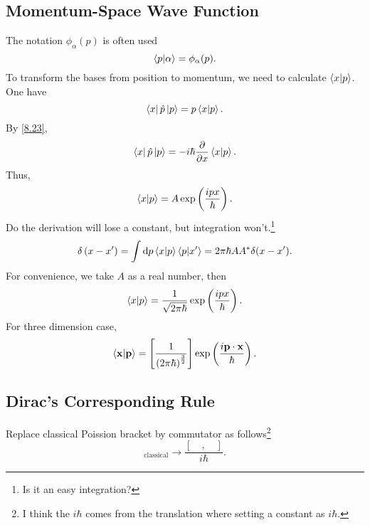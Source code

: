 \documentclass{article}
\theoremstyle{1}
\newcommand{\pa}{\partial}
\begin{document}
\subsection{Momentum-Space Wave Function}
The notation $\phi_\alpha(p)$ is often used 
\begin{equation}
    \braket{p}{\alpha}=\phi_{\alpha}(p).
\end{equation}
To transform the bases from position to momentum, we need to calculate $\braket{x}{p}$.
\newline
One have 
\begin{equation}
    \bra{x}\hat{p}\ket{p}=p\bra{x}\ket{p}.
\end{equation}
By \eqref{8.23},
\begin{equation}
   \bra{x}\hat{p}\ket{p}=-i\hbar\frac{\pa}{\pa x}\bra{x}\ket{p}.
\end{equation}
Thus, 
\begin{equation}
    \bra{x}\ket{p}=A\exp\left(\frac{ipx}{\hbar}\right).
\end{equation}
Do the derivation will lose a constant, but integration won't.\footnote{Is it an easy integration?}
\begin{equation}
    \delta\left(x-x'\right)=\int \dd{p}\bra{x}\ket{p}\bra{p}\ket{x'}=2\pi \hbar AA^*\delta(x-x').
\end{equation}
For convenience, we take $A$ as a real number, then 
\begin{equation}
    \bra{x}\ket{p}=\frac{1}{\sqrt{2\pi \hbar}}\exp\left(\frac{ipx}{\hbar}\right).
\end{equation}
For three dimension case, 
\begin{equation}
    \bra{\mathbf{x}}\ket{\mathbf{p}}=\left[\frac{1}{\left(2\pi\hbar\right)^{\frac{3}{2}}}\right]\exp\left(\frac{i\mathbf{p}\cdot\mathbf{x}}{\hbar}\right).
\end{equation}
\subsection{Dirac's Corresponding Rule}
Replace classical Poission bracket by commutator as follows\footnote{I think the $i\hbar$ comes from the translation where setting a constant as $i\hbar$.}
\begin{equation}
    [\quad ,\quad ]_{\text{classical}}\longrightarrow \frac{[\quad ,\quad ]}{i\hbar}.
\end{equation}
\end{document}
